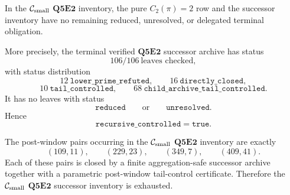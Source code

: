 \begin{theorem}
\label{thm:q5e2-current-successor-inventory-closed}
In the \(\mathcal C_{\mathrm{small}}\) \(\mathbf{Q5E2}\) inventory, the pure \(C_2(\pi)=2\) row and
the successor inventory have no remaining reduced, unresolved, or delegated
terminal obligation.

More precisely, the terminal verified \(\mathbf{Q5E2}\) successor archive has
status
\[
  106/106\ \text{leaves checked},
\]
with status distribution
\[
  12\ \mathtt{lower\_prime\_refuted},
  \qquad
  16\ \mathtt{directly\_closed},
\]
\[
  10\ \mathtt{tail\_controlled},
  \qquad
  68\ \mathtt{child\_archive\_tail\_controlled}.
\]
It has no leaves with status
\[
  \mathtt{reduced}
  \qquad\text{or}\qquad
  \mathtt{unresolved}.
\]
Hence
\[
  \mathtt{recursive\_controlled}=\mathtt{true}.
\]

The post-window pairs occurring in the \(\mathcal C_{\mathrm{small}}\) \(\mathbf{Q5E2}\) inventory are
exactly
\[
  (109,11),
  \qquad
  (229,23),
  \qquad
  (349,7),
  \qquad
  (409,41).
\]
Each of these pairs is closed by a finite aggregation-safe successor archive
together with a parametric post-window tail-control certificate.  Therefore the
\(\mathcal C_{\mathrm{small}}\) \(\mathbf{Q5E2}\) successor inventory is exhausted.
\end{theorem}

